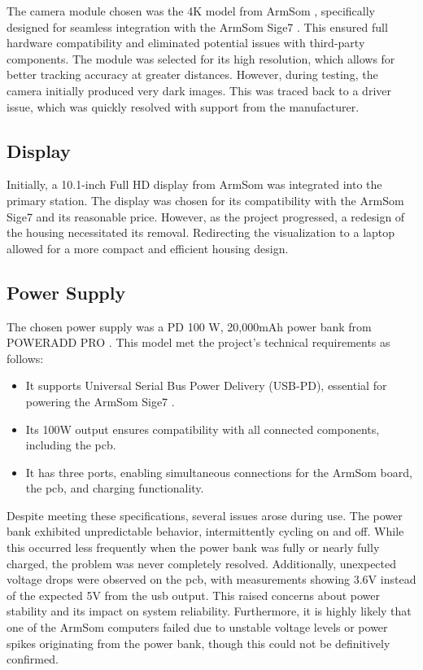The camera module chosen was the 4K model from ArmSom \cite{armsom_camera_module}, specifically designed for seamless integration with the ArmSom Sige7 \cite{armsom_sige7}. This ensured full hardware compatibility and eliminated potential issues with third-party components. The module was selected for its high resolution, which allows for better tracking accuracy at greater distances. However, during testing, the camera initially produced very dark images. This was traced back to a driver issue, which was quickly resolved with support from the manufacturer.

\subsection{Display}

Initially, a 10.1-inch Full HD display from ArmSom \cite{armsom_display} was integrated into the primary station. The display was chosen for its compatibility with the ArmSom Sige7 \cite{armsom_sige7} and its reasonable price. However, as the project progressed, a redesign of the housing necessitated its removal. Redirecting the visualization to a laptop allowed for a more compact and efficient housing design.

\subsection{Power Supply}

The chosen power supply was a PD 100 W, 20,000mAh power bank from POWERADD PRO \cite{poweradd_pro_powerbank}. This model met the project's technical requirements as follows:
\begin{itemize}
	\item It supports Universal Serial Bus Power Delivery (USB-PD), essential for powering the ArmSom Sige7 \cite{armsom_sige7}.
	\item Its 100W output ensures compatibility with all connected components, including the \acrshort{pcb}.
	\item It has three ports, enabling simultaneous connections for the ArmSom board, the \acrshort{pcb}, and charging functionality.
\end{itemize}

Despite meeting these specifications, several issues arose during use. The power bank exhibited unpredictable behavior, intermittently cycling on and off. While this occurred less frequently when the power bank was fully or nearly fully charged, the problem was never completely resolved. Additionally, unexpected voltage drops were observed on the \acrshort{pcb}, with measurements showing 3.6V instead of the expected 5V from the \acrfull{usb} output. This raised concerns about power stability and its impact on system reliability. Furthermore, it is highly likely that one of the ArmSom computers failed due to unstable voltage levels or power spikes originating from the power bank, though this could not be definitively confirmed.


